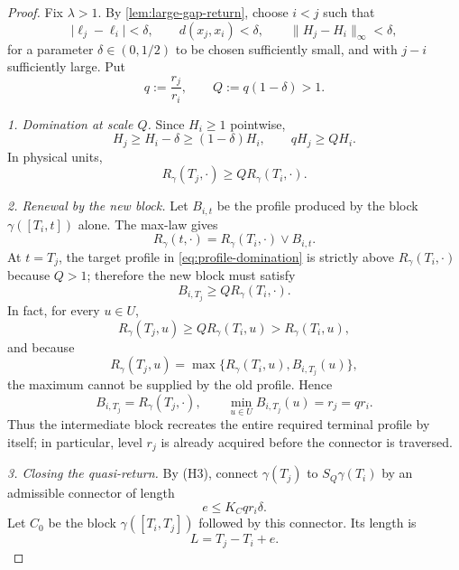 \documentclass[10pt,a4paper]{article}
\theoremstyle{definition}
\theoremstyle{remark}
\newcommand{\norm}[1]{\lVert #1\rVert}
\newcommand{\abs}[1]{\lvert #1\rvert}
\newcommand{\vmax}{\mathbin{\vee}}
\begin{document}
\begin{proof}
Fix $\lambda>1$. By \cref{lem:large-gap-return}, choose $i<j$ such that
\begin{equation}
\abs{\ell_j-\ell_i}<\delta,
\qquad
d(x_j,x_i)<\delta,
\qquad
\norm{H_j-H_i}_\infty<\delta,
\label{eq:quasi-return-data}
\end{equation}
for a parameter $\delta\in(0,1/2)$ to be chosen sufficiently small, and with $j-i$ sufficiently large. Put
\begin{equation}
q:=\frac{r_j}{r_i},
\qquad
Q:=q(1-\delta)>1.
\label{eq:q-Q}
\end{equation}

\emph{1. Domination at scale $Q$.}
Since $H_i\ge1$ pointwise,
\[
H_j\ge H_i-\delta\ge(1-\delta)H_i,
\qquad
qH_j\ge QH_i.
\]
In physical units,
\begin{equation}
R_\gamma(T_j,\cdot)\ge Q R_\gamma(T_i,\cdot).
\label{eq:profile-domination}
\end{equation}

\emph{2. Renewal by the new block.}
Let $B_{i,t}$ be the profile produced by the block $\gamma([T_i,t])$ alone. The max-law gives
\[
R_\gamma(t,\cdot)=R_\gamma(T_i,\cdot)\vmax B_{i,t}.
\]
At $t=T_j$, the target profile in \eqref{eq:profile-domination} is strictly above $R_\gamma(T_i,\cdot)$ because $Q>1$; therefore the new block must satisfy
\begin{equation}
B_{i,T_j}\ge Q R_\gamma(T_i,\cdot).
\label{eq:block-renewal}
\end{equation}
In fact, for every $u\in U$,
\[
R_\gamma(T_j,u)\ge Q R_\gamma(T_i,u)>R_\gamma(T_i,u),
\]
and because
\[
R_\gamma(T_j,u)=\max\{R_\gamma(T_i,u),B_{i,T_j}(u)\},
\]
the maximum cannot be supplied by the old profile. Hence
\begin{equation}
B_{i,T_j}=R_\gamma(T_j,\cdot),
\qquad
\min_{u\in U}B_{i,T_j}(u)=r_j=qr_i.
\label{eq:exact-block-profile}
\end{equation}
Thus the intermediate block recreates the entire required terminal profile by itself; in particular, level $r_j$ is already acquired before the connector is traversed.

\emph{3. Closing the quasi-return.}
By (H3), connect $\gamma(T_j)$ to $S_Q\gamma(T_i)$ by an admissible connector of length
\begin{equation}
e\le K_Cqr_i\delta.
\label{eq:connector-cost}
\end{equation}
Let $C_0$ be the block $\gamma([T_i,T_j])$ followed by this connector. Its length is
\[
L=T_j-T_i+e.
\]


\end{proof}
\end{document}
